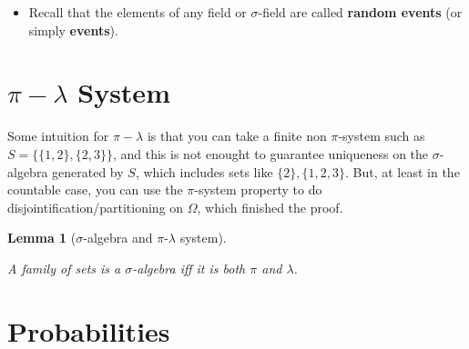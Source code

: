 \documentclass[
  letterpaper,
  DIV=11,
  numbers=noendperiod]{scrreprt}
\providecommand{\tightlist}{%
  \setlength{\itemsep}{0pt}\setlength{\parskip}{0pt}}\usepackage{longtable,booktabs,array}
\theoremstyle{plain}
\theoremstyle{definition}
\theoremstyle{definition}
\theoremstyle{plain}
\theoremstyle{plain}
\newtheorem{lemma}{Lemma}[chapter]
\theoremstyle{remark}
\begin{document}
\begin{itemize}
\tightlist
\item
  Recall that the elements of any field or \(\sigma\)-field are called
  \textbf{random events} (or simply \textbf{events}).
\end{itemize}

\section{\texorpdfstring{\(\pi-\lambda\)
System}{\textbackslash pi-\textbackslash lambda System}}\label{pi-lambda-system}

Some intuition for \(\pi-\lambda\) is that you can take a finite non
\(\pi\)-system such as \(S = \{\{1,2\},\{2,3\}\}\), and this is not
enought to guarantee uniqueness on the \(\sigma\)-algebra generated by
\(S\), which includes sets like \(\{2\}, \{1,2,3\}\). But, at least in
the countable case, you can use the \(\pi\)-system property to do
disjointification/partitioning on \(\Omega\), which finished the proof.

\begin{lemma}[\(\sigma\)-algebra and \(\pi\)-\(\lambda\)
system]\protect\hypertarget{lem-pilambda}{}\label{lem-pilambda}

A family of sets is a \(\sigma\)-algebra iff it is both \(\pi\) and
\(\lambda\).

\end{lemma}

\section{Probabilities}\label{probabilities}
\end{document}
